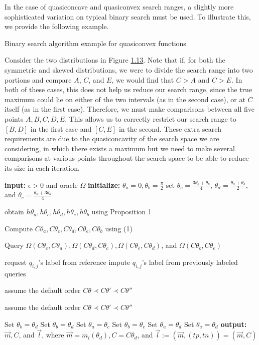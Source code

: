 \documentclass[
  letterpaper,
  DIV=11,
  numbers=noendperiod,
  oneside]{scrreprt}
\theoremstyle{remark}
\begin{document}
In the case of quasiconcave and quasiconvex search ranges, a slightly
more sophisticated variation on typical binary search must be used. To
illustrate this, we provide the following example.

Binary search algorithm example for quasiconvex functions

Consider the two distributions in Figure \hyperref[bsearch]{1.13}. Note
that if, for both the symmetric and skewed distributions, we were to
divide the search range into two portions and compare \(A\), \(C\), and
\(E\), we would find that \(C>A\) and \(C>E\). In both of these cases,
this does not help us reduce our search range, since the true maximum
could lie on either of the two intervals (as in the second case), or at
\(C\) itself (as in the first case). Therefore, we must make comparisons
between all five points \(A, B, C, D, E\). This allows us to correctly
restrict our search range to \([B, D]\) in the first case and \([C, E]\)
in the second. These extra search requirements are due to the
quasiconcavity of the search space we are considering, in which there
exists a maximum but we need to make several comparisons at various
points throughout the search space to be able to reduce its size in each
iteration.

\textbf{input:} \(\epsilon > 0\) and oracle \(\Omega\)
\textbf{initialize:} \(\theta_a = 0, \theta_b = \frac{\pi}{2}\) set
\(\theta_c = \frac{3\theta_a+\theta_b}{4}\),
\(\theta_d = \frac{\theta_a+\theta_b}{2}\), and
\(\theta_e = \frac{\theta_a+3\theta_b}{4}\)

obtain \(h\theta_a, h\theta_c, h\theta_d, h\theta_e, h\theta_b\) using
Proposition 1

Compute \(C\theta_a, C\theta_c, C\theta_d, C\theta_e, C\theta_b\) using
(1)

Query
\(\Omega(C\theta_c, C\theta_a), \Omega(C\theta_d, C\theta_c), \Omega(C\theta_e, C\theta_d)\),
and \(\Omega(C\theta_b, C\theta_e)\)

request \(q_{i,j}\)'s label from reference impute \(q_{i,j}\)'s label
from previously labeled queries

assume the default order \(C\theta \prec C\theta' \prec C\theta''\)

assume the default order \(C\theta \prec C\theta' \prec C\theta''\)

Set \(\theta_b = \theta_d\) Set \(\theta_b = \theta_d\) Set
\(\theta_a = \theta_c\) Set \(\theta_b = \theta_e\) Set
\(\theta_a = \theta_d\) Set \(\theta_a = \theta_d\) \textbf{output:}
\(\vec{m}, C\), and \(\vec{l}\), where
\(\vec{m} = m_l(\theta_d), C = C\theta_d\), and
\(\vec{l} := (\vec{m}, (tp, tn)) = (\vec{m}, C)\)
\end{document}
